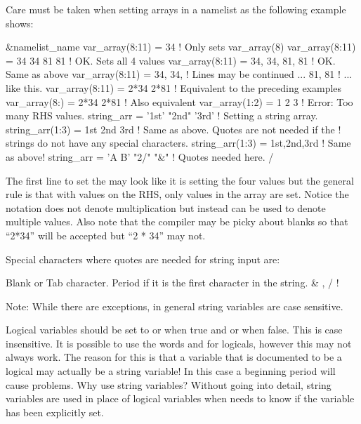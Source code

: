 Care must be taken when setting arrays in a namelist as the following example
shows:
\begin{example}
  &namelist_name
    var_array(8:11) = 34             ! Only sets var_array(8)
    var_array(8:11) = 34 34 81 81    ! OK. Sets all 4 values
    var_array(8:11) = 34, 34, 81, 81 ! OK. Same as above
    var_array(8:11) = 34, 34,        ! Lines may be continued ...
                      81, 81         !   ... like this.
    var_array(8:11) = 2*34 2*81      ! Equivalent to the preceding examples
    var_array(8:)   = 2*34 2*81      ! Also equivalent
    var_array(1:2) = 1 2 3           ! Error: Too many RHS values.
    string_arr = '1st' "2nd" '3rd'   ! Setting a string array.
    string_arr(1:3) = 1st 2nd 3rd    ! Same as above. Quotes are not needed if the 
                                     ! strings do not have any special characters.
    string_arr(1:3) = 1st,2nd,3rd    ! Same as above!
    string_arr = 'A B' "2/" "&"      ! Quotes needed here.
  /
\end{example}
The first line to set the  may look like it is setting 
the four values  but the general rule is that with 
values on the RHS, only  values in the array are set. Notice the notation
 does not denote multiplication but instead can be used to denote
multiple values. Also note that the compiler may be picky about blanks so 
that ``2*34'' will be accepted but ``2 * 34'' may not.

Special characters where quotes are needed for string input are:
\begin{example}
  Blank or Tab character.
  Period if it is the first character in the string.
  &   ,   /    !   %
\end{example}
Note: While there are exceptions, in general \tao string variables are
case sensitive.

Logical variables should be set to  or  when true and
 or  when false. This is case insensitive. It is
possible to use the words  and  for logicals,
however this may not always work. The reason for this is that a
variable that is documented to be a logical may actually be a string
variable! In this case a beginning period will cause problems. Why use
string variables? Without going into detail, string variables are used
in place of logical variables when \tao needs to know if the variable
has been explicitly set.

